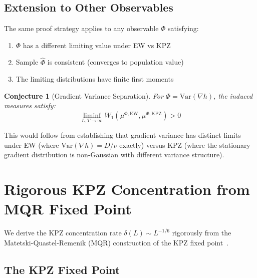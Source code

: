 \documentclass[aps,pre,reprint,amsmath,amssymb,superscriptaddress]{revtex4-2}
\newtheorem{conjecture}{Conjecture}
\newcommand{\EW}{\text{EW}}
\newcommand{\KPZ}{\text{KPZ}}
\begin{document}
\subsection{Extension to Other Observables}

The same proof strategy applies to any observable $\Phi$ satisfying:
\begin{enumerate}
\item $\Phi$ has a different limiting value under EW vs KPZ
\item Sample $\hat{\Phi}$ is consistent (converges to population value)
\item The limiting distributions have finite first moments
\end{enumerate}

\begin{conjecture}[Gradient Variance Separation]
\label{conj:gradient-separation}
For $\Phi = \text{Var}(\nabla h)$, the induced measures satisfy:
\begin{equation}
\liminf_{L,T \to \infty} W_1(\mu^{\Phi,\EW}, \mu^{\Phi,\KPZ}) > 0
\end{equation}
\end{conjecture}

This would follow from establishing that gradient variance has distinct limits under EW (where $\text{Var}(\nabla h) = D/\nu$ exactly) versus KPZ (where the stationary gradient distribution is non-Gaussian with different variance structure).

\section{Rigorous KPZ Concentration from MQR Fixed Point}
\label{app:KPZ-concentration}

We derive the KPZ concentration rate $\delta(L) \sim L^{-1/6}$ rigorously from the Matetski-Quastel-Remenik (MQR) construction of the KPZ fixed point~\cite{MQR2021}.

\subsection{The KPZ Fixed Point}
\end{document}
